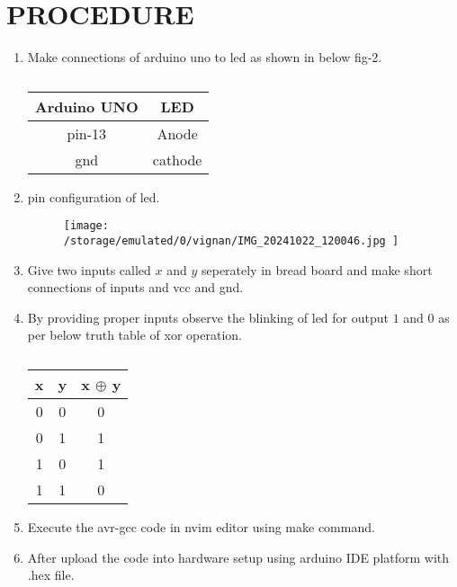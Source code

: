 \documentclass[conference]{IEEEtran}
\begin{document}
\section{PROCEDURE}
 \begin{enumerate}

\item Make connections of arduino uno to led as shown in below fig-2.

\vspace{0.1cm}
 \begin{table} [htbp]
\centering
\begin{tabular}{| c | c |} \hline
Arduino UNO & LED \\ \hline
pin-13 &  Anode \\ \hline
gnd & cathode \\ \hline 
\end{tabular}
\vspace{0.1cm}
\caption{\label{tab:widgets}}
\end{table}

\item pin configuration of led.             
	\begin{figure}[h]           
	\centering                       
	\texttt{[image:  /storage/emulated/0/vignan/IMG\_20241022\_120046.jpg      ]}                         
	\caption{\label{fig-1:Gates}} 
	\end{figure}










\item Give two inputs called $x$ and $y$ seperately in bread board and make short connections of inputs and vcc and gnd.

\item By providing proper inputs observe the blinking of led for output $1$ and $0$ as per below truth table of xor operation.

	\begin{table} [htbp]
		\centering
\begin{tabular}{|c|c|c|}\hline
x & y & x $\oplus$ y \\\hline
0 & 0 & 0  \\ \hline
0 & 1 & 1 \\ \hline
1 & 0 & 1 \\ \hline
1 & 1 & 0 \\ \hline
\end{tabular}
		\vspace{0.1cm}
		\caption{\label{tab:widgets}}
	\end{table}



\item Execute the avr-gcc code in nvim editor using make command.
\item After upload the code into hardware setup using arduino IDE platform with .hex file.
 \end{enumerate}
\end{document}
